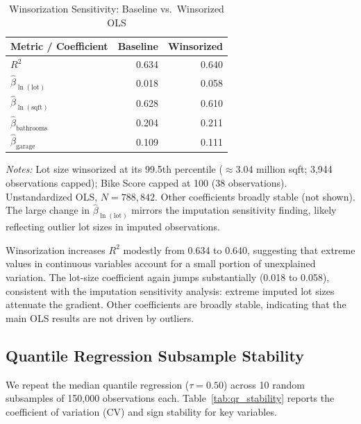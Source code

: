 \begin{table}[H]
\centering
\caption{Winsorization Sensitivity: Baseline vs.\ Winsorized OLS}
\label{tab:winsorization}
\begin{threeparttable}
\small
\begin{tabular}{lrr}
\toprule
Metric / Coefficient & Baseline & Winsorized \\
\midrule
$R^2$ & 0.634 & 0.640 \\
$\hat{\beta}_{\ln(\text{lot})}$ & 0.018 & 0.058 \\
$\hat{\beta}_{\ln(\text{sqft})}$ & 0.628 & 0.610 \\
$\hat{\beta}_{\text{bathrooms}}$ & 0.204 & 0.211 \\
$\hat{\beta}_{\text{garage}}$ & 0.109 & 0.111 \\
\bottomrule
\end{tabular}
\begin{tablenotes}
\small
\item \textit{Notes:} Lot size winsorized at its 99.5th percentile ($\approx 3.04$ million sqft; 3,944 observations capped); Bike Score capped at 100 (38 observations). Unstandardized OLS, $N = 788{,}842$. Other coefficients broadly stable (not shown). The large change in $\hat{\beta}_{\ln(\text{lot})}$ mirrors the imputation sensitivity finding, likely reflecting outlier lot sizes in imputed observations.
\end{tablenotes}
\end{threeparttable}
\end{table}

Winsorization increases $R^2$ modestly from 0.634 to 0.640, suggesting that extreme values in continuous variables account for a small portion of unexplained variation. The lot-size coefficient again jumps substantially (0.018 to 0.058), consistent with the imputation sensitivity analysis: extreme imputed lot sizes attenuate the gradient. Other coefficients are broadly stable, indicating that the main OLS results are not driven by outliers.


\subsection{Quantile Regression Subsample Stability}
\label{sec:qr_stability}

We repeat the median quantile regression ($\tau = 0.50$) across 10 random subsamples of 150,000 observations each. Table~\ref{tab:qr_stability} reports the coefficient of variation (CV) and sign stability for key variables.

